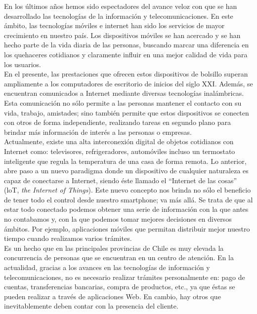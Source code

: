 
En los últimos años hemos sido espectadores del avance veloz con que se han desarrollado las tecnologías de la información y telecomunicaciones. En este ámbito, las tecnologías móviles e internet han sido los servicios de mayor crecimiento en nuestro país\cite{Pew14}. Los dispositivos móviles se han acercado y se han hecho parte de la vida diaria de las personas, buscando marcar una diferencia en los quehaceres cotidianos y claramente influir en una mejor calidad de vida para los usuarios.\\

En el presente, las prestaciones que ofrecen estos dispositivos de bolsillo superan ampliamente a los computadores de escritorio de inicios del siglo XXI. Además, se encuentran comunicados a Internet mediante diversas tecnologías inalámbricas. Esta comunicación no sólo permite a las personas mantener el contacto con su vida, trabajo, amistades; sino también permite que estos dispositivos se conecten con otros de forma independiente, realizando tareas en segundo plano para brindar más información de interés a las personas o empresas. \\

Actualmente, existe una alta interconexión digital de objetos cotidianos con Internet como: televisores, refrigeradores, automóviles incluso un termostato inteligente que regula la temperatura de una casa de forma remota\cite{Gre13}. Lo anterior, abre paso a un nuevo paradigma donde un dispositivo de cualquier naturaleza es capaz de conectarse a Internet, siendo éste llamado el ``Internet de las cosas'' (loT, \textit{the Internet of Things}). Este nuevo concepto nos brinda no sólo el beneficio de tener todo el control desde nuestro smartphone; va más allá. Se trata de que al estar todo conectado podemos obtener una serie de información con la que antes no contabamos y, con la que podemos tomar mejores decisiones en diversos ámbitos. Por ejemplo, aplicaciones móviles que permitan distribuir mejor nuestro tiempo cuando realizamos varios trámites.\\

Es un hecho que en las principales provincias de Chile es muy elevada la concurrencia de personas que se encuentran en un centro de atención. En la actualidad, gracias a los avances en las tecnologías de información y telecomunicaciones, no es necesario realizar trámites personalmente en: pago de cuentas, transferencias bancarias, compra de productos, etc., ya que éstas se pueden realizar a través de aplicaciones Web. En cambio, hay otros que inevitablemente deben contar con la presencia del cliente.\\

